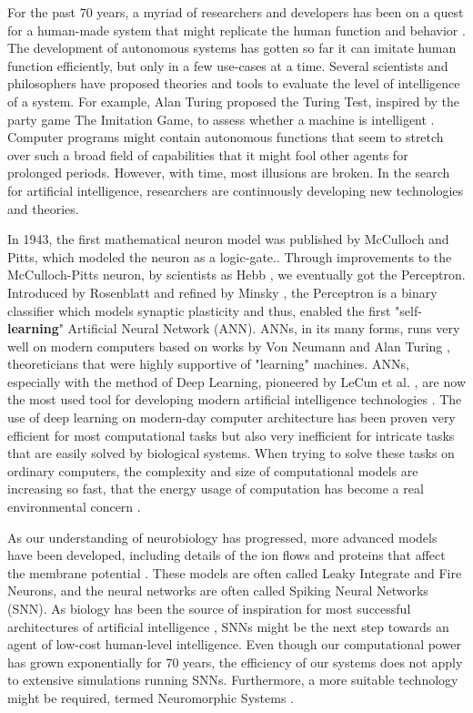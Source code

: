 For the past 70 years, a myriad of researchers and developers has been on a quest for a human-made system that might replicate the human function and behavior \cite{haenlein_brief_2019}.
The development of autonomous systems has gotten so far it can imitate human function efficiently, but only in a few use-cases at a time.
Several scientists and philosophers have proposed theories and tools to evaluate the level of intelligence of a system.
For example, Alan Turing proposed the Turing Test, inspired by the party game The Imitation Game, to assess whether a machine is intelligent \cite{turing_computing_2009}.
Computer programs might contain autonomous functions that seem to stretch over such a broad field of capabilities
that it might fool other agents for prolonged periods. However, with time, most illusions are broken.
In the search for artificial intelligence, researchers are continuously developing new technologies and theories.

In 1943, the first mathematical neuron model was published by McCulloch and Pitts, which modeled the neuron as a logic-gate.\cite{cowan_discussion_1990}.
Through improvements to the McCulloch-Pitts neuron, by scientists as Hebb \cite{brown_legacy_2003}, we eventually got the Perceptron.
Introduced by Rosenblatt \cite{rosenblatt_perceptron_1958} and refined by Minsky \cite{minsky_perceptrons_2017}, the Perceptron is a binary classifier which models synaptic plasticity and thus, enabled the first "self-\textbf{learning}" Artificial Neural Network (ANN).
ANNs, in its many forms, runs very well on modern computers based on works by Von Neumann and Alan Turing \cite{von_neumann_first_1993}, theoreticians that were highly supportive of "learning" machines. ANNs, especially with the method of Deep Learning, pioneered by LeCun et al. \cite{lecun_gradient-based_1998}, are now the most used tool for developing modern artificial intelligence technologies \cite{haenlein_brief_2019}. The use of deep learning on modern-day computer architecture has been proven very efficient for most computational tasks but also very inefficient for intricate tasks that are easily solved by biological systems.
When trying to solve these tasks on ordinary computers, the complexity and size of computational models are increasing so fast,
that the energy usage of computation has become a real environmental concern \cite{computation_energy_environment}.

As our understanding of neurobiology has progressed, more advanced models have been developed, including details of the ion flows and proteins that affect the membrane potential \cite{burkitt_review_2006}.
These models are often called Leaky Integrate and Fire Neurons, and the neural networks are often called Spiking Neural Networks (SNN). As biology has been the source of inspiration for most successful architectures of artificial intelligence \cite{minsky_perceptrons_2017}, SNNs might be the next step towards an agent of low-cost human-level intelligence.
Even though our computational power has grown exponentially for 70 years, the efficiency of our systems does not apply to extensive simulations running SNNs.
Furthermore, a more suitable technology might be required, termed Neuromorphic Systems \cite{furber_large-scale_2016}\cite{schuman_survey_2017}.

